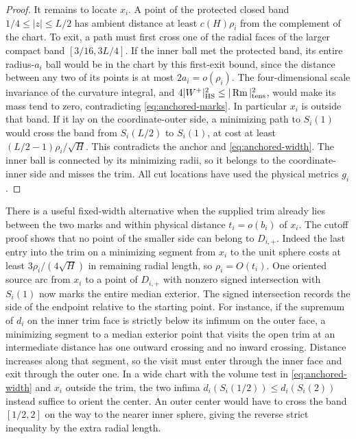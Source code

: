 \begin{proof}
It remains to locate \(x_i\). A point of the protected closed
band \(1/4\le |z|\le L/2\) has ambient distance at least
\(c(H)\rho_i\) from the complement of the chart. To exit, a
path must first cross one of the radial faces of the larger
compact band \([3/16,3L/4]\). If the inner ball met the
protected band, its entire radius-\(a_i\) ball would be in
the chart by this first-exit bound, since the distance between
any two of its points is at most \(2a_i=o(\rho_i)\). The
four-dimensional scale invariance of the curvature integral,
and \(4|W^+|_{\rm HS}^2\le |\operatorname{Rm}|_{\rm tens}^2\), would make
its mass tend to zero, contradicting \eqref{eq:anchored-marks}.
In particular \(x_i\) is outside that band. If it lay on the
coordinate-outer side, a minimizing path to \(S_i(1)\) would
cross the band from \(S_i(L/2)\) to \(S_i(1)\), at cost at least
\((L/2-1)\rho_i/\sqrt H\). This contradicts the anchor and
\eqref{eq:anchored-width}. The inner ball is connected by its
minimizing radii, so it belongs to the coordinate-inner side
and misses the trim. All cut locations have used the physical
metrics \(g_i\).
\end{proof}

There is a useful fixed-width alternative when the supplied trim
already lies between the two marks and within physical distance
\(t_i=o(b_i)\) of \(x_i\). The cutoff proof shows that no point
of the smaller side can belong to \(D_{i,+}\). Indeed the last
entry into the trim on a minimizing segment from \(x_i\) to the
unit sphere costs at least \(3\rho_i/(4\sqrt H)\) in remaining
radial length, so \(\rho_i=O(t_i)\). One oriented source arc
from \(x_i\) to a point of \(D_{i,+}\) with nonzero signed
intersection with \(S_i(1)\) now marks the entire median
exterior. The signed intersection records the side of the
endpoint relative to the starting point. For instance, if the
supremum of \(d_i\) on the inner trim face is strictly below
its infimum on the outer face, a minimizing segment to a median
exterior point that visits the open trim at an intermediate
distance has one outward crossing and no inward crossing.
Distance increases along that segment, so the visit must enter
through the inner face and exit through the outer one. In a
wide chart with the volume test in \eqref{eq:anchored-width}
and \(x_i\) outside the trim, the two infima
\(d_i(S_i(1/2))\le d_i(S_i(2))\) instead suffice to orient
the center. An outer center would have to cross the band
\([1/2,2]\) on the way to the nearer inner sphere, giving the
reverse strict inequality by the extra radial length.

